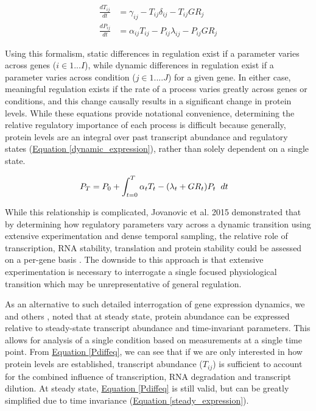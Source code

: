 \begin{subequations}
\begin{align}
\frac{dT_{ij}}{dt} &= \gamma_{ij} - T_{ij}\delta_{ij} - T_{ij}GR_{j}\label{Tdiffeq}\\
\frac{dP_{ij}}{dt} &= \alpha_{ij}T_{ij} - P_{ij}\lambda_{ij} - P_{ij}GR_{j}\label{Pdiffeq}
\end{align}
\end{subequations}

Using this formalism, static differences in regulation exist if a parameter varies across genes ($i \in 1 ... I$), while dynamic differences in regulation exist if a parameter varies across condition ($j \in 1....J$) for a given gene.  In either case, meaningful regulation exists if the rate of a process varies greatly across genes or conditions, and this change causally results in a significant change in protein levels. While these equations provide notational convenience, determining the relative regulatory importance of each process is difficult because generally, protein levels are an integral over past transcript abundance and regulatory states (\hyperref[dynamic_expression]{Equation \ref{dynamic_expression}}), rather than solely dependent on a single state.

\begin{align}
P_{T} &= P_{0} + \int_{t = 0}^{T} \alpha_{t} T_{t} - (\lambda_{t} + GR_{t}) P_{t} \hspace{2mm} dt \label{dynamic_expression}
\end{align}

While this relationship is complicated, Jovanovic et al. 2015 demonstrated that by determining how regulatory parameters vary across a dynamic transition using extensive experimentation and dense temporal sampling, the relative role of transcription, RNA stability, translation and protein stability could be assessed on a per-gene basis \cite{Jovanovic:2015hp}. The downside to this approach is that extensive experimentation is necessary to interrogate a single focused physiological transition which may be unrepresentative of general regulation.

As an alternative to such detailed interrogation of gene expression dynamics, we and others \cite{Belle:2006hv, Csardi:2015kx}, noted that at steady state, protein abundance can be expressed relative to steady-state transcript abundance and time-invariant parameters. This allows for analysis of a single condition based on measurements at a single time point.  From \hyperref[Pdiffeq]{Equation \ref{Pdiffeq}}, we can see that if we are only interested in how protein levels are established, transcript abundance ($T_{ij}$) is sufficient to account for the combined influence of transcription, RNA degradation and transcript dilution. At steady state, \hyperref[Pdiffeq]{Equation \ref{Pdiffeq}} is still valid, but can be greatly simplified due to time invariance (\hyperref[steady_expression]{Equation \ref{steady_expression}}).

